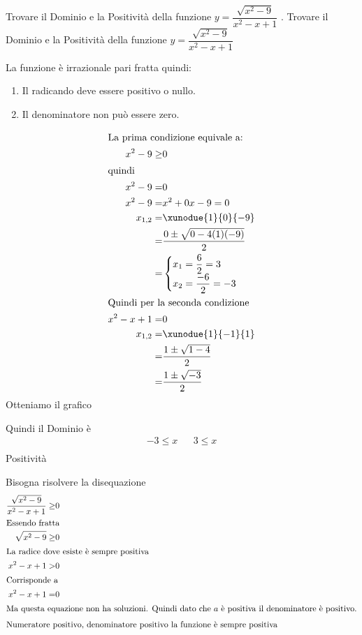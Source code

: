 \begin{exercise}
	Trovare il Dominio e la Positività  della funzione  $y=\dfrac{\sqrt{x^2-9}}{x^2-x+1}$ .
	\tcblower
	Trovare il Dominio e la Positività  della funzione  $y=\dfrac{\sqrt{x^2-9}}{x^2-x+1}$
	
	La funzione è irrazionale pari fratta quindi:
	\begin{enumerate}
		\item Il radicando deve essere positivo o nullo.
		\item Il denominatore non può essere zero.
	\end{enumerate}
	\begin{align*}
		\intertext{La prima condizione equivale a:}
		x^2-9\geq &0\\
		\intertext{quindi}
		x^2-9=&0\\
		x^2-9=&x^2+0x-9=0\\
		x_{1,2}=&\xunodue{1}{0}{-9}\\
		=&\dfrac{0\pm\sqrt{0-4(1)(-9)}}{2}\\
		=&\begin{cases}
			x_1=\dfrac{6}{2}=3\\
			x_2=\dfrac{-6}{2}=-3
		\end{cases}\\
		\intertext{Quindi per la seconda condizione}
		x^2-x+1=&0\\
	x_{1,2}=&\xunodue{1}{-1}{1}\\
	=&\dfrac{1\pm\sqrt{1-4}}{2}\\
	=&\dfrac{1\pm\sqrt{-3}}{2}\\
	\end{align*}
	Otteniamo il grafico 
	\begin{center}
		
	\end{center}
	Quindi il Dominio  è 
	\begin{align*}
		-3\leq x&&3\leq x\\
	\end{align*}
 Positività
 
 Bisogna risolvere la disequazione 
 \begin{align*}
 \dfrac{\sqrt{x^2-9}}{x^2-x+1}\geq&0\\
 \intertext{Essendo fratta}
 \sqrt{x^2-9}\geq&0\\
 \intertext{La radice dove esiste è sempre positiva}
  x^2-x+1>&0\\ 
  \intertext{Corrisponde a}
  x^2-x+1=&0\\ 
  \intertext{Ma questa equazione non ha soluzioni. Quindi dato che $a$ è positiva il denominatore è positivo.}
  \intertext{Numeratore positivo, denominatore positivo la funzione è sempre positiva}
 \end{align*} 
\end{exercise}